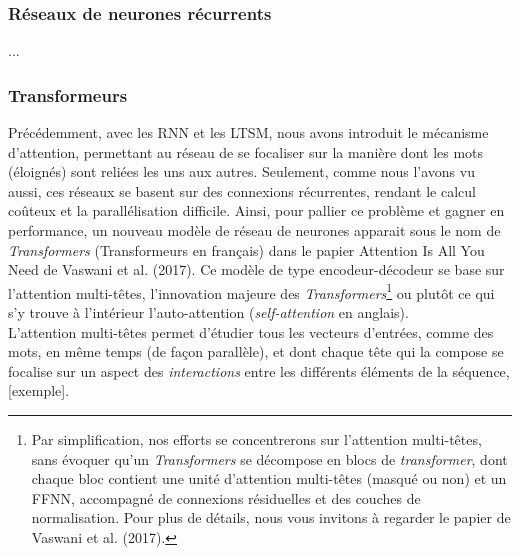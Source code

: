 \documentclass[12pt, french, twoside]{report}
\begin{document}
\subsubsection{Réseaux de neurones récurrents}

...


\subsubsection{Transformeurs}

Précédemment, avec les RNN et les LTSM, nous avons introduit le mécanisme d'attention, permettant au réseau de se focaliser sur la manière dont les mots (éloignés) sont reliées les uns aux autres. Seulement, comme nous l'avons vu aussi, ces réseaux se basent sur des connexions récurrentes, rendant le calcul coûteux et la parallélisation difficile. Ainsi, pour pallier ce problème et gagner en performance, un nouveau modèle de réseau de neurones apparait sous le nom de \textit{Transformers} (Transformeurs en français) dans le papier \og Attention Is All You Need \fg\; de Vaswani et al. (2017)\cite{transformer}. Ce modèle de type encodeur-décodeur se base sur l'attention multi-têtes, l'innovation majeure des \textit{Transformers}\footnote{Par simplification, nos efforts se concentrerons sur l'attention multi-têtes, sans évoquer qu'un \textit{Transformers} se décompose en blocs de \textit{transformer}, dont chaque bloc contient une unité d'attention multi-têtes (masqué ou non) et un FFNN, accompagné de connexions résiduelles et des couches de normalisation. Pour plus de détails, nous vous invitons à regarder le papier de Vaswani et al. (2017)\cite{transformer}.} ou plutôt ce qui s'y trouve à l'intérieur l'auto-attention (\textit{self-attention} en anglais).\\

L'attention multi-têtes permet d'étudier tous les vecteurs d'entrées, comme des mots, en même temps (de façon parallèle), et dont chaque tête qui la compose se focalise sur un aspect des \textit{interactions} entre les différents éléments de la séquence, [exemple].\\ 
\end{document}
